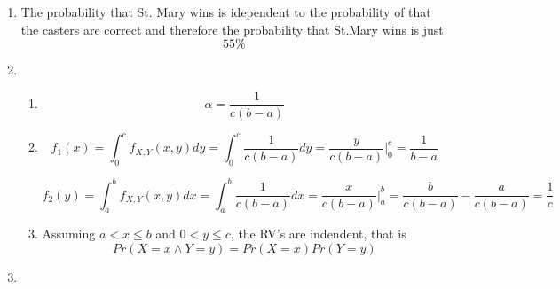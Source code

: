 \documentclass{article}
\begin{document}
\begin{enumerate}
\item 
The probability that St. Mary wins is idependent to the probability of that the
casters are correct and therefore the probability that St.Mary wins is just 
\[55\%\]

\item
	\begin{enumerate}
	  \item \[\alpha = \frac{1}{c(b-a)}\]
	  \item 
	  \[f_1(x) = \int_0^c f_{X,Y}(x,y)dy = \int_0^c \frac{1}{c(b-a)}dy =
	  \frac{y}{c(b-a)}\Big|_0^c = \frac{1}{b-a}\]
	  
	  \[f_2(y) = \int_a^b f_{X,Y}(x,y)dx = \int_a^b \frac{1}{c(b-a)}dx = 
	  \frac{x}{c(b-a)}\Big|_a^b = \frac{b}{c(b-a)} - \frac{a}{c(b-a)} = \frac{1}{c}
	  \]
	  \item Assuming  \( a < x \leq b \) and \( 0 < y \leq c \), the RV's are
	  indendent, that is \[Pr( X = x \wedge Y = y) = Pr(X = x)Pr(Y = y)\]
	  
	\end{enumerate}
\item 
\end{enumerate}
\end{document}
